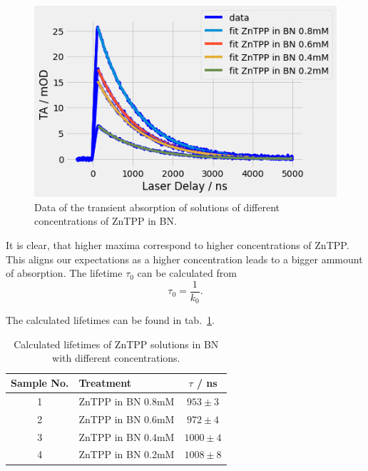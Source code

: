 \begin{figure}[h]
    \centering
    \includegraphics[width = \textwidth]{Bilder/Auswertung/TRAS/ZnTPPdiffConc.png}
    \caption{Data of the transient absorption of solutions of different concentrations of ZnTPP in BN.}
    \label{fig:TRAS-Conc}
\end{figure}

It is clear, that higher maxima correspond to higher concentrations of ZnTPP. This aligns our expectations as a higher concentration leads to a bigger ammount of absorption. The lifetime $\tau_0$ can be calculated from 
\begin{equation}
    \tau_0 = \frac{1}{k_0}.
\end{equation}

The calculated lifetimes can be found in tab.~\ref{tab:lifetimesConc}.

\begin{table}[ht]
    \centering
    \begin{tabular}{clc}
        \toprule
        Sample No. &    Treatment &    $\tau$ / \si{\nano\second} \\
        \midrule
        1 &     ZnTPP in BN 0.8mM &  $953 \pm 3$ \\
        2 &     ZnTPP in BN 0.6mM &  $972 \pm 4$ \\
        3 &     ZnTPP in BN 0.4mM & $1000 \pm 4$ \\
        4 &     ZnTPP in BN 0.2mM & $1008 \pm 8$ \\
        \bottomrule
    \end{tabular}
    \caption{Calculated lifetimes of ZnTPP solutions in BN with different concentrations.}
    \label{tab:lifetimesConc}
\end{table}